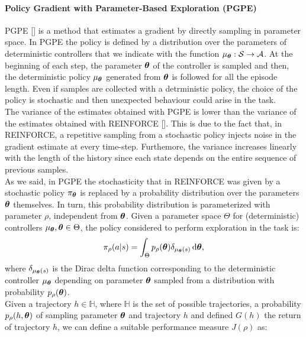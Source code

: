 \paragraph{Policy Gradient with Parameter-Based Exploration (PGPE)} \label{subsec:pgpe}
\ac{PGPE} [\cite{sehnke2008PolicyGradient}] is a method that estimates a gradient by directly sampling in parameter space. In \ac{PGPE} the policy is defined by a distribution over the parameters of deterministic controllers that we indicate with the function $\mu_{\boldsymbol{\theta}}: \mathcal{S} \to \mathcal{A}$. At the beginning of each step, the parameter $\boldsymbol{\theta}$ of the controller is sampled and then, the deterministic policy $\mu_{\boldsymbol{\theta}}$ generated from $\boldsymbol{\theta}$ is followed for all the episode length. Even if samples are collected with a detrministic policy, the choice of the policy is stochastic and then unexpected behaviour could arise in the task.\\
\newline
The variance of the estimates obtained with \ac{PGPE} is lower than the variance of the estimates obtained with REINFORCE [\cite{zhao2013efficient}]. This is due to the fact that, in REINFORCE, a repetitive sampling from a stochastic policy injects noise in the gradient estimate at every time-step. Furthemore, the variance increases linearly with the length of the history since each state depends on the entire sequence of previous samples.\\
\newline
As we said, in \ac{PGPE} the stochasticity that in REINFORCE was given by a stochastic policy $\pi_{\boldsymbol{\theta}}$ is replaced by a probability distribution over the parameters $\boldsymbol{\theta}$ themselves. In turn, this probability distribution is parameterized with parameter $\rho$, independent from $\boldsymbol{\theta}$. Given a parameter space $\Theta$ for (deterministic) controllers $\mu_{\boldsymbol{\theta}}, \boldsymbol{\theta} \in \Theta$, the policy considered to perform exploration in the task is:
\begin{align}
\pi_{\rho}(a|s) = \int_{\Theta} p_{\rho}(\boldsymbol{\theta}) \delta_{\mu_{\boldsymbol{\theta}}(s)}\,\mathrm{d} \boldsymbol{\theta},
\end{align}
where $\delta_{\mu_{\boldsymbol{\theta}}(s)}$ is the Dirac delta function corresponding to the deterministic controller $\mu_{\boldsymbol{\theta}}$ depending on parameter $\boldsymbol{\theta}$ sampled from a distribution with probability $p_{\rho}(\boldsymbol{\theta})$.\\
\newline
Given a trajectory $h \in \mathbb{H}$, where $\mathbb{H}$ is the set of possible trajectories, a probability $p_{\rho}(h, \boldsymbol{\theta})$ of sampling parameter $\boldsymbol{\theta}$ and trajectory $h$ and defined $G(h)$ the return of trajectory $h$, we can define a suitable performance measure $J(\rho)$ as:
